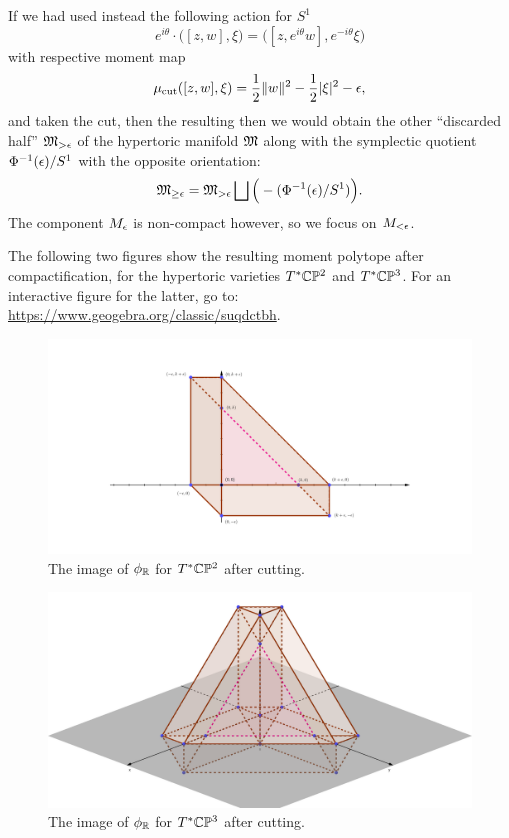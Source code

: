 \begin{rmk}
	If we had used instead the following action for $S^{1}$
	\begin{equation*}
		e^{i\theta}\cdot \big( [z,w], \xi \big) = \big( [z,e^{i\theta}w], e^{-i\theta}\xi \big)
	\end{equation*}
	with respective moment map
	\begin{equation*}
		\mu_{\text{cut}} ([z,w],\xi) = \frac{1}{2}\|w\|^{2} - \frac{1}{2}|\xi|^{2} - \epsilon,
	\end{equation*}
	and taken the cut, then the resulting then we would obtain the other ``discarded half'' $\mathfrak{M}_{>\epsilon}$ of the hypertoric manifold $\mathfrak{M}$ along with the symplectic quotient $\Phi^{-1}(\epsilon)/S^{1}$ with the opposite orientation:
	\begin{equation*}
		\mathfrak{M}_{\geq \epsilon} = \mathfrak{M}_{> \epsilon} \bigsqcup \Big(-(\Phi^{-1}(\epsilon)/S^{1})\Big).
	\end{equation*}
	The component $M_{\epsilon}$ is non-compact however, so we focus on $M_{<\epsilon}$.
\end{rmk}

The following two figures show the resulting moment polytope after compactification, for the hypertoric varieties $T^{\ast}\mathbb{C}\mathbb{P}^{2}$ and $T^{\ast}\mathbb{C}\mathbb{P}^{3}$. For an interactive figure for the latter, go to: \href{https://www.geogebra.org/classic/suqdctbh}{https://www.geogebra.org/classic/suqdctbh}.

\begin{figure}[h!]
		\includegraphics[width=1.2\linewidth]{Symplectic_Cut_Cotangent_CP2.png}
		\caption{The image of $\phi_{\mathbb{R}}$ for $T^{\ast}\mathbb{C}\mathbb{P}^{2}$ after cutting.}
		\label{fig:test1}
\end{figure}

\begin{figure}[h!]
	\includegraphics[width=1\linewidth]{Symplectic_Cut_Cotangent_CP3.png}
	\caption{The image of $\phi_{\mathbb{R}}$ for $T^{\ast}\mathbb{C}\mathbb{P}^{3}$ after cutting.}
	\label{fig:test1}
\end{figure}


